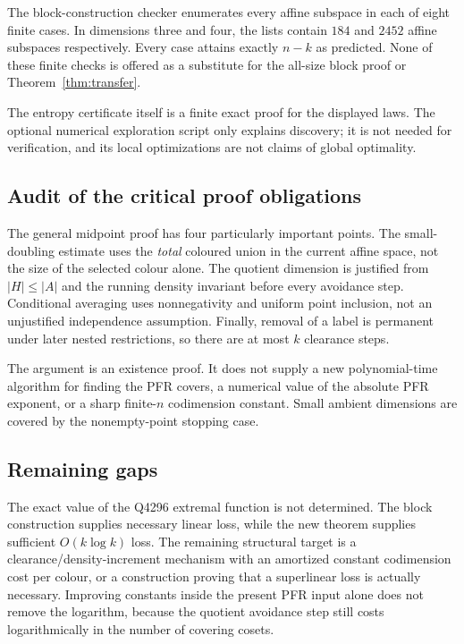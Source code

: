 \documentclass[11pt]{article}
\theoremstyle{remark}
\begin{document}
The block-construction checker enumerates every affine subspace in each
of eight finite cases. In dimensions three and four, the lists contain
$184$ and $2452$ affine subspaces respectively. Every case attains exactly
$n-k$ as predicted. None of these finite checks is offered as a substitute
for the all-size block proof or Theorem~\ref{thm:transfer}.

The entropy certificate itself is a finite exact proof for the displayed
laws. The optional numerical exploration script only explains discovery;
it is not needed for verification, and its local optimizations are not
claims of global optimality.

\subsection{Audit of the critical proof obligations}

The general midpoint proof has four particularly important points.
The small-doubling estimate uses the \emph{total} coloured union in the
current affine space, not the size of the selected colour alone.
The quotient dimension is justified from $|H|\leq|A|$ and the running
density invariant before every avoidance step. Conditional averaging uses
nonnegativity and uniform point inclusion, not an unjustified independence
assumption. Finally, removal of a label is permanent under later nested
restrictions, so there are at most $k$ clearance steps.

The argument is an existence proof. It does not supply a new polynomial-time
algorithm for finding the PFR covers, a numerical value of the absolute
PFR exponent, or a sharp finite-$n$ codimension constant. Small ambient
dimensions are covered by the nonempty-point stopping case.

\subsection{Remaining gaps}

The exact value of the Q4296 extremal function is not determined. The
block construction supplies necessary linear loss, while the new theorem
supplies sufficient $O(k\log k)$ loss. The remaining structural target is
a clearance/density-increment mechanism with an amortized constant
codimension cost per colour, or a construction proving that a
superlinear loss is actually necessary. Improving constants inside the
present PFR input alone does not remove the logarithm, because the
quotient avoidance step still costs logarithmically in the number of
covering cosets.
\end{document}

